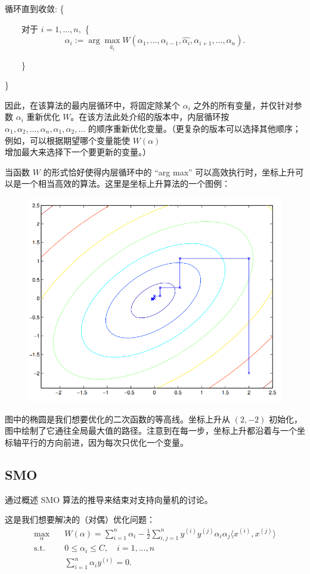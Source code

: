 循环直到收敛: \{

    $\quad\quad$对于 $i=1,\dots,n,$ \{
        \[
            \alpha_i := \arg\max_{\hat a_i} W(\alpha_1,\dots,\alpha_{i-1},\hat{\alpha_i},\alpha_{i+1},\dots,\alpha_n).
        \]
        
    $\quad\quad$\}

\}

因此，在该算法的最内层循环中，将固定除某个 $\alpha_i$ 之外的所有变量，并仅针对参数 $\alpha_i$ 重新优化 $W$。在该方法此处介绍的版本中，内层循环按 $\alpha_1, \alpha_2, \dots, \alpha_n, \alpha_1, \alpha_2, \dots$ 的顺序重新优化变量。（更复杂的版本可以选择其他顺序；例如，可以根据期望哪个变量能使 $W(\alpha)$ 增加最大来选择下一个要更新的变量。）

当函数 $W$ 的形式恰好使得内层循环中的 “arg max” 可以高效执行时，坐标上升可以是一个相当高效的算法。这里是坐标上升算法的一个图例：

\begin{figure}[H]
    \centering
    \includegraphics[width=0.5\linewidth]{figs/svm_coordinate_ascent.png}
\end{figure}


图中的椭圆是我们想要优化的二次函数的等高线。坐标上升从 $(2, -2)$ 初始化，图中绘制了它通往全局最大值的路径。注意到在每一步，坐标上升都沿着与一个坐标轴平行的方向前进，因为每次只优化一个变量。

\subsection{SMO}

通过概述 SMO 算法的推导来结束对支持向量机的讨论。

这是我们想要解决的（对偶）优化问题：
\begin{align}
    \max_\alpha \quad &W(\alpha) = \sum_{i=1}^n \alpha_i - \frac{1}{2} \sum_{i,j=1}^n y^{(i)} y^{(j)} \alpha_i \alpha_j \langle x^{(i)}, x^{(j)} \rangle \\
    \text{s.t.} \quad &0 \le \alpha_i \le C, \quad i=1,\dots,n \label{eq:6.20}\\
    &\sum_{i=1}^n \alpha_i y^{(i)} = 0. \label{eq:6.21}
\end{align}

